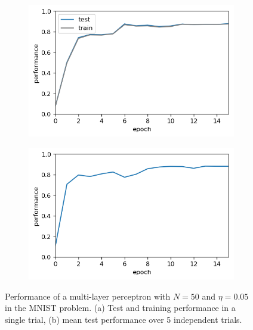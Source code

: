 \documentclass{article}
\begin{document}
\begin{figure}[h]
	\centering
	\begin{subfigure}[t]{0.42\linewidth}
		\centering
		\includegraphics[width = 1.0\linewidth, trim={5 5 5 5}, clip=true]{figures/N50_eta05_nepoch15_transfer_tanh_performance.png}
		\subcaption{}
	\end{subfigure}%
	\hspace{0.05 \linewidth}
	\begin{subfigure}[t]{0.42\linewidth}
		\centering
		\includegraphics[width = 1.0\linewidth, trim={5 5 5 5}, clip=true]{figures/N50_eta05_nepoch15_ntrial5_transfer_tanh_performance.png}
		\subcaption{}	
	\end{subfigure}%
\caption{Performance of a multi-layer perceptron with $N=50$ and $\eta = 0.05$ in the MNIST problem. (a) Test and training performance in a single trial, (b) mean test performance over 5 independent trials.}
\label{fig:N50}
\end{figure}
\end{document}
